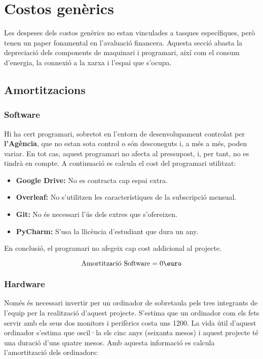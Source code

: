 \section{Costos genèrics}
Les despeses dels costos genèrics no estan vinculades a tasques específiques, però tenen un paper fonamental en l'avaluació financera. Aquesta secció abasta la depreciació dels components de maquinari i programari, així com el consum d'energia, la connexió a la xarxa i l'espai que s'ocupa. 

\subsection{Amortitzacions}
\subsubsection{Software}
Hi ha cert programari, sobretot en l'entorn de desenvolupament controlat per \textbf{l'Agència}, que no estan sota control o són desconeguts i, a més a més, poden variar. En tot cas, aquest programari no afecta al pressupost, i, per tant, no es tindrà en compte. A continuació es calcula el cost del programari utilitzat:

\begin{itemize}
    \item \textbf{Google Drive:} No es contracta cap espai extra.
    \item \textbf{Overleaf:} No s'utilitzen les característiques de la subscripció mensual.
    \item \textbf{Git:} No és necessari l'ús dels extres que s'ofereixen.
    \item \textbf{PyCharm:} S'usa la llicència d'estudiant que dura un any.
\end{itemize}

En conclusió, el programari no afegeix cap cost addicional al projecte.

$$
\text{Amortització Software} = 0\text{\euro}
$$

\subsubsection{Hardware}
Només és necessari invertir per un ordinador de sobretaula pels tres integrants de l'equip per la realització d'aquest projecte. S'estima que un ordinador com els fets servir amb els seus dos monitors i perifèrics costa uns 1200\text{\euro}. La vida útil d'aquest ordinador s'estima que oscil·la els cinc anys (seixanta mesos) i aquest projecte té una duració d'uns quatre mesos. Amb aquesta informació es calcula l'amortització dels ordinadors:

